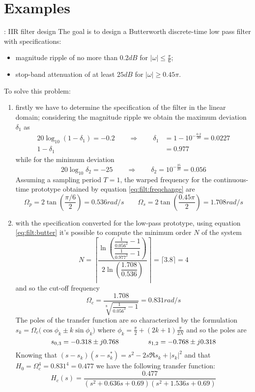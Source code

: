 	\section{Examples}
		\begin{example}{: IIR filter design}
			The goal is to design a Butterworth discrete-time low pass filter with specifications:
			\begin{itemize}
				\item magnitude ripple of no more than $0.2dB$ for $|\omega|\leq \frac \pi 6$;
				\item stop-band attenuation of at least $25dB$ for $|\omega| \geq 0.45\pi$.
			\end{itemize}
			To solve this problem:
			\begin{enumerate}
				\item firstly we have to determine the specification of the filter in the linear domain; considering the magnitude ripple we obtain the maximum deviation $\delta_1$ as
				\begin{align*}
					20 \log_{10}(1-\delta_1) = -0.2 \qquad \Rightarrow \qquad \delta_1 & = 1 - 10^{-\frac{0.2}{20}} = 0.0227 \\
					1-\delta_1 &= 0.977
				\end{align*}
				while for the minimum deviation
				\[ 20\log_{10}\delta_2 = - 25 \qquad \Rightarrow \qquad \delta_2 = 10^{-\frac{25}{20}} = 0.056 \]
				Assuming a sampling period $T=1$, the warped frequency for the continuous-time prototype obtained by equation \ref{eq:filt:freqchange} are
				\[ \Omega_p = 2 \tan\left( \frac{\pi/6}2 \right) = 0.536 rad/s \qquad \Omega_s = 2 \tan\left( \frac{0.45\pi}{2} \right) = 1.708 rad/s  \]
				
				\item with the specification converted for the low-pass prototype, using equation \ref{eq:filt:butter} it's possible to compute the minimum order $N$ of the system 
				\[ N = \left\lceil \frac{\ln \left( \dfrac{ \frac 1 {0.056^2} -1 }{\frac{1}{0.977^2}-1} \right)}{2 \ln \left(\dfrac{1.708}{0.536}\right)} \right\rceil = \big\lceil   3.8 \big\rceil = 4\]
				and so the cut-off frequency
				\[ \Omega_c = \frac{1.708}{\sqrt[8]{\frac{1}{0.056^2}-1}} = 0.831 rad/s \]
				The poles of the transfer function are so characterized by the formulation $s_k = \Omega_c\big(\cos\phi_k \pm k \sin\phi_k\big)$ where $\phi_k = \frac \pi 2 + (2k+1)\frac{\pi}{2N}$ and so the poles are
				\[ s_{0,3} = -0.318 \pm j0.768 \hspace{1.5cm} s_{1,2} = -0.768 \pm j 0.318 \]
				Knowing that $(s-s_k)(s-s_k^*) = s^2 -2s\Re{s_k} + |s_k|^2$ and that $H_0 = \Omega_c^4 = 0.831^4 = 0.477$ we have the following transfer function:
				\[ H_c(s) = \frac{0.477}{(s^2 + 0.636s +0.69)(s^2 + 1.536s + 0.69)} \]
				

\end{enumerate}
\end{example}
